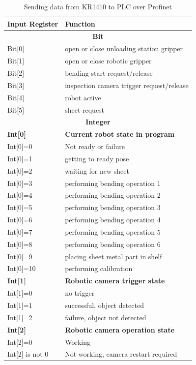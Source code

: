 \begin{table}[h]
  \centering
  \small
  \renewcommand{\arraystretch}{1.2} %
  \begin{tabular}{l@{\hskip 2cm}l}
    \hline
      \textbf{Input Register} & \textbf{Function} \\ \hline
      \multicolumn{2}{c}{\textbf{Bit}} \\ \hline
      Bit[0] & open or close unloading station gripper \\
      Bit[1] & open or close robotic gripper\\
      Bit[2] & bending start request/release\\
      Bit[3] & inspection camera trigger request/release\\
      Bit[4] & robot active\\
      Bit[5] & sheet request\\\hline
      \multicolumn{2}{c}{\textbf{Integer}} \\ \hline
      \textbf{Int[0]} & \textbf{Current robot state in program}\\
      Int[0]=0 & Not ready or failure\\
      Int[0]=1 & getting to ready pose\\
      Int[0]=2 & waiting for new sheet\\
      Int[0]=3 & performing bending operation 1\\
      Int[0]=4 & performing bending operation 2\\
      Int[0]=5 & performing bending operation 3\\
      Int[0]=6 & performing bending operation 4\\
      Int[0]=7 & performing bending operation 5\\
      Int[0]=8 & performing bending operation 6\\
      Int[0]=9 & placing sheet metal part in shelf\\
      Int[0]=10 & performing calibration\\
      \textbf{Int[1]} & \textbf{Robotic camera trigger state}\\
      Int[1]=0 & no trigger\\
      Int[1]=1 & successful, object detected\\
      Int[1]=2 & failure, object not detected\\
      \textbf{Int[2]} & \textbf{Robotic camera operation state}\\
      Int[2]=0 & Working\\
      Int[2] is not 0 & Not working, camera restart required\\
      \hline
  \end{tabular}
  \caption{Sending data from KR1410 to PLC over Profinet}
  \label{tab:kr1410-to-plc}
\end{table}

